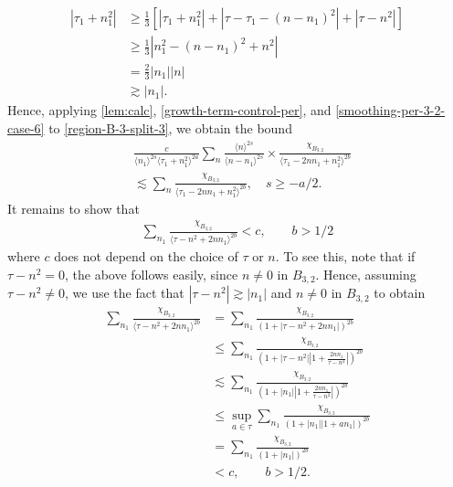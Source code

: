 \documentclass[12pt,reqno]{amsart}
\numberwithin{equation}{section}  %
\begin{document}
\begin{equation}
  \label{smoothing-per-3-2-case-6}
\begin{split}
  | \tau_{1} + n_{1}^{2} |
  & \ge \frac{1}{3}\left[ | \tau_{1} + n_{1}^{2} | + | \tau -
  \tau_{1} - (n - n_{1})^{2}
  | + | \tau - n^{2} | \right]
  \\
  & \ge \frac{1}{3} |  n_{1}^{2} - (n - n_{1})^{2} + n^{2} |
  \\
  & = \frac{2}{3} | n_{1} | | n |
  \\
  & \gtrsim | n_{1} |.
\end{split}
\end{equation}
%
Hence, applying
\cref{lem:calc}, \eqref{growth-term-control-per}, and
\eqref{smoothing-per-3-2-case-6} to \eqref{region-B-3-split-3}, we obtain the bound
%
%
\begin{equation*}
  \begin{split}
    &  \frac{c}{\langle n_{1} \rangle ^{2s}
    \langle \tau_{1} + n_{1}^{2} \rangle
    ^{2a}} \sum_{n} \frac{\langle n \rangle ^{2s}}{\langle
    n - n_{1}\rangle ^{2s}}  \times \frac{\chi_{B_{3,2}}}{\langle
    \tau_{1} - 2nn_{1} + n_{1}^{2} \rangle^{2b} } 
    \\
    & \lesssim 
    \sum_{n} \frac{\chi_{B_{3,2}}}{\langle
    \tau_{1} - 2nn_{1} + n_{1}^{2} \rangle^{2b} },
    \quad s \ge -a/2.
  \end{split}
\end{equation*}
%
%
%
It remains to show that 
%
%
%
\begin{equation}
  \label{sum-bound}
\begin{split}
\sum_{n_{1} } \frac{\chi_{B_{3,2}}}{\langle \tau - n^{2} + 2nn_{1}
\rangle^{2b} } < c, \qquad b > 1/2
\end{split}
\end{equation}
%
%
where $c$ does not depend on the choice of $\tau$ or $n$. 
%
%
To see this, note that if $\tau - n^{2} = 0$, the above follows easily, since
$n \neq 0$ in $B_{3,2}$.
Hence, assuming $\tau - n^{2} \neq 0$, we use the fact that $| \tau - n^{2} |
\gtrsim | n_{1} |$ and $n \neq 0$ in $B_{3,2}$ to obtain 
%
%
\begin{equation*}
\begin{split}
\sum_{n_{1}} \frac{\chi_{B_{3,2}}}{\langle \tau - n^{2} + 2nn_{1}
\rangle^{2b} }
& = \sum_{n_{1}} \frac{\chi_{B_{3,2}}}{(1 + | \tau - n^{2} +
2nn_{1} |)^{2b}}
\\
& \le \sum_{n_{1}} \frac{\chi_{B_{3,2}}}{(1 + | \tau - n^{2}
| | 1 + \frac{2nn_{1}}{\tau - n^{2}} |)^{2b}}
\\
& \lesssim \sum_{n_{1}} \frac{\chi_{B_{3,2}}}{(1 + |n_{1}|
| 1 + \frac{2nn_{1}}{\tau - n^{2}} |)^{2b}}
\\
& \le \sup_{a \in \tau} \sum_{n_{1}} \frac{\chi_{B_{3,2}}}{(1 + |n_{1}|
| 1 + an_{1}|)^{2b} }
\\
& = \sum_{n_{1}} \frac{\chi_{B_{3,2}}}{(1 + |n_{1}|)^{2b}}
\\
& < c, \qquad b > 1/2.
\end{split}
\end{equation*}
\end{document}
